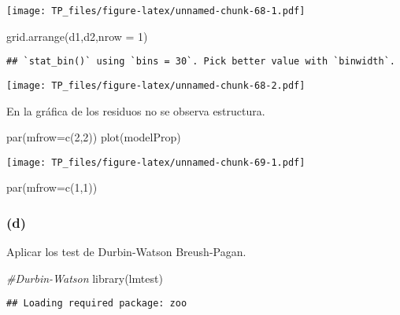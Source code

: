 \documentclass[
]{article}
\newenvironment{Shaded}{\begin{snugshade}}{\end{snugshade}}
\newcommand{\AttributeTok}[1]{\textcolor[rgb]{0.77,0.63,0.00}{#1}}
\newcommand{\CommentTok}[1]{\textcolor[rgb]{0.56,0.35,0.01}{\textit{#1}}}
\newcommand{\DecValTok}[1]{\textcolor[rgb]{0.00,0.00,0.81}{#1}}
\newcommand{\FunctionTok}[1]{\textcolor[rgb]{0.00,0.00,0.00}{#1}}
\newcommand{\NormalTok}[1]{#1}
\begin{document}
\texttt{[image: TP\_files/figure-latex/unnamed-chunk-68-1.pdf]}

\begin{Shaded}
\begin{Highlighting}[]
\FunctionTok{grid.arrange}\NormalTok{(d1,d2,}\AttributeTok{nrow =} \DecValTok{1}\NormalTok{)}
\end{Highlighting}
\end{Shaded}

\begin{verbatim}
## `stat_bin()` using `bins = 30`. Pick better value with `binwidth`.
\end{verbatim}

\texttt{[image: TP\_files/figure-latex/unnamed-chunk-68-2.pdf]}

En la gráfica de los residuos no se observa estructura.

\begin{Shaded}
\begin{Highlighting}[]
\FunctionTok{par}\NormalTok{(}\AttributeTok{mfrow=}\FunctionTok{c}\NormalTok{(}\DecValTok{2}\NormalTok{,}\DecValTok{2}\NormalTok{))}
\FunctionTok{plot}\NormalTok{(modelProp)}
\end{Highlighting}
\end{Shaded}

\texttt{[image: TP\_files/figure-latex/unnamed-chunk-69-1.pdf]}

\begin{Shaded}
\begin{Highlighting}[]
\FunctionTok{par}\NormalTok{(}\AttributeTok{mfrow=}\FunctionTok{c}\NormalTok{(}\DecValTok{1}\NormalTok{,}\DecValTok{1}\NormalTok{))}
\end{Highlighting}
\end{Shaded}

\hypertarget{d-3}{%
\subsubsection{(d)}\label{d-3}}

Aplicar los test de Durbin-Watson Breush-Pagan.

\begin{Shaded}
\begin{Highlighting}[]
\CommentTok{\#Durbin{-}Watson}
\FunctionTok{library}\NormalTok{(lmtest)}
\end{Highlighting}
\end{Shaded}

\begin{verbatim}
## Loading required package: zoo
\end{verbatim}
\end{document}
